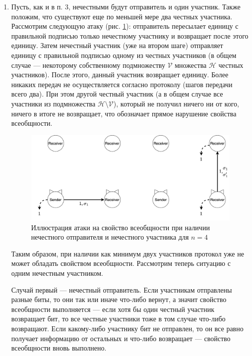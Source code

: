 \documentclass[12pt, a4paper]{extarticle}
\begin{document}
\begin{enumerate}
    \item Пусть, как и в п. 3, нечестными будут отправитель и один участник. Также положим, что существуют
        еще по меньшей мере два честных участника. Рассмотрим следующую атаку (рис. \ref{fig:6.5}):
        отправитель пересылает единицу с правильной подписью только нечестному участнику и возвращает
        после этого единицу. Затем нечестный участник (уже на втором шаге) отправляет единицу с правильной
        подписью одному из честных участников (в общем случае --- некоторому собственному подмножеству
        $\mathcal{V}$ множества $\mathcal{H}$ честных участников). После этого, данный участник возвращает 
        единицу. Более никаких передач не осуществляется согласно протоколу (шагов передачи всего два). 
        При этом другой честный участник (а в общем случае все участники из подмножества 
        $\mathcal{H} \setminus \mathcal{V}$), который не получил ничего ни от кого, ничего в итоге не 
        возвращает, что обозначает прямое нарушение свойства всеобщности.
        
        \begin{figure}[h!]
            \centering
            \includegraphics[width=\textwidth]{6.5.png}
            \caption{Иллюстрация атаки на свойство всеобщности при наличии нечестного отправителя и 
                нечестного участника для $n = 4$}
            \label{fig:6.5}
        \end{figure}
        
        Таким образом, при наличии как минимум двух участников протокол уже не может обладать свойством
        всеобщности. Рассмотрим теперь ситуацию с одним нечестным участником.
        
        Случай первый --- нечестный отправитель. Если участникам отправлены разные биты, то они так или
        иначе что-либо вернут, а значит свойство всеобщности выполняется --- если хотя бы один честный
        участник возвращает бит, то все честные участники тоже в том случае что-либо возвращают. Если
        какому-либо участнику бит не отправлен, то он все равно получает информацию от остальных и что-либо
        возвращает --- свойство всеобщности вновь выполнено.
        

\end{enumerate}
\end{document}
